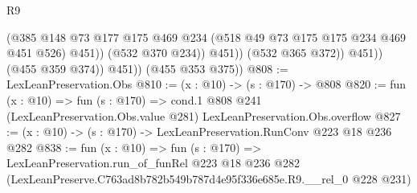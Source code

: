 \begin{lexlean}{R9}
\begin{coremodule}
                          (@385
                            @148
                            @73
                            @177
                            @175
                            @469
                            @234
                            (@518 @49 @73 @175 @175 @234 @469 @451 @526)
                            @451))
                        (@532 @370 @234))
                      @451))
                  (@532 @365 @372))
                @451))
            (@455 @359 @374))
          @451))
      (@455 @353 @375))
@808 := LexLeanPreservation.Obs
@810 := (x : @10) -> (s : @170) -> @808
@820 := fun (x : @10) =>
  fun (s : @170) =>
  cond.{1} @808 @241 (LexLeanPreservation.Obs.value @281) LexLeanPreservation.Obs.overflow
@827 := (x : @10) -> (s : @170) -> LexLeanPreservation.RunConv @223 @18 @236 @282
@838 := fun (x : @10) =>
  fun (s : @170) =>
  LexLeanPreservation.run_of_funRel
    @223
    @18
    @236
    @282
    (LexLeanPreserve.C763ad8b782b549b787d4e95f336e685e.R9.__rel_0 @228 @231)
\end{coremodule}
\end{lexlean}
